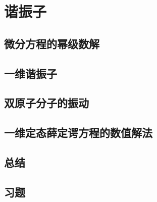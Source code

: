 \chapter{谐振子}
\section{微分方程的幂级数解}

\section{一维谐振子}

\section{双原子分子的振动}

\section{一维定态薛定谔方程的数值解法}

\section*{总结}

\section*{习题}
